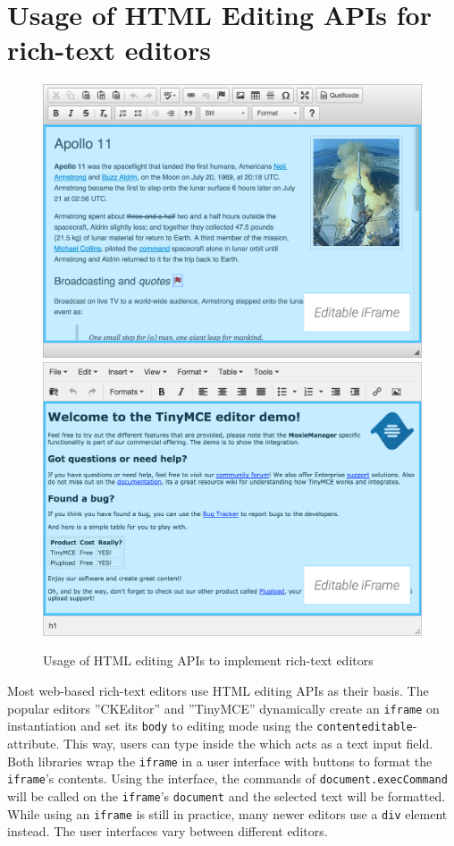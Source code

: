 
\section{Usage of HTML Editing APIs for rich-text editors}
\label{sec:useage-of-html-editing-apis}


\begin{figure}
\centering
  \includegraphics[width=.4\linewidth]{images/ckeditor-demo-overlayed.png}
  \includegraphics[width=.4\linewidth]{images/tinymce-demo-overlayed.png}
\caption{Usage of HTML editing APIs to implement rich-text editors}
\label{fig:usage_contenteditable_screenshots}
\end{figure}


Most web-based rich-text editors use HTML editing APIs as their basis. The popular editors ''CKEditor'' and ''TinyMCE'' dynamically create an \texttt{iframe} on instantiation and set its \texttt{body} to editing mode using the \texttt{contenteditable}-attribute. This way, users can type inside the  which acts as a text input field. Both libraries wrap the \texttt{iframe} in a user interface with buttons to format the \texttt{iframe}'s contents. Using the interface, the commands of \texttt{document.execCommand} will be called on the \texttt{iframe}'s \texttt{document} and the selected text will be formatted. While using an \texttt{iframe} is still in practice, many newer editors use a  \texttt{div} element instead. The user interfaces vary between different editors. %

